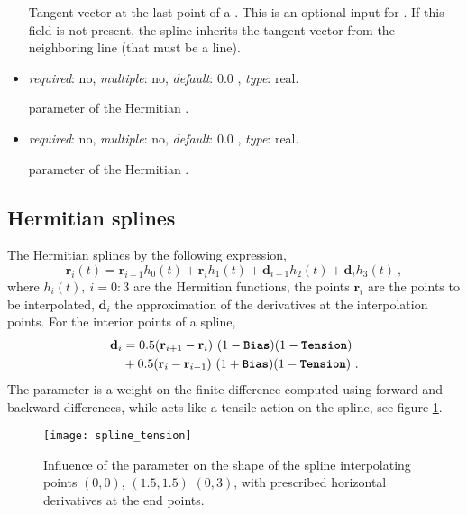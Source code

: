 \begin{itemize}
    Tangent vector at the last point of a . This is an optional input for . If this field is not present, the spline inherits the tangent vector from the neighboring line (that must be a  line).

\item {} \textit{required}: no, \textit{multiple}: no, \textit{default}: 0.0 , \textit{type}: real.

     parameter of the Hermitian .

\item {} \textit{required}: no, \textit{multiple}: no, \textit{default}: 0.0 , \textit{type}: real.

     parameter of the Hermitian .

\end{itemize}

\subsection{Hermitian splines}
The Hermitian splines by the following expression,
\begin{equation}
\mathbf{r}_i(t) = \mathbf{r}_{i-1} h_0(t) + \mathbf{r}_{i} h_1(t) +
                  \mathbf{d}_{i-1} h_2(t) + \mathbf{d}_{i} h_3(t) \ ,
\end{equation}
where $h_i(t), \ i=0:3$ are the Hermitian functions, the points $\mathbf{r}_i$ are the points to be interpolated, $\mathbf{d}_i$ the approximation of the derivatives at the interpolation points. For the interior points of a spline,
\begin{equation}
\begin{aligned}
\mathbf{d}_i & = 0.5 ( \mathbf{r}_{i+1} - \mathbf{r}_{i  } ) \ (1-\param{Bias}) (1-\param{Tension}) \\
             & + 0.5 ( \mathbf{r}_{i  } - \mathbf{r}_{i-1} ) \ (1+\param{Bias}) (1-\param{Tension}) \ .
\end{aligned}
\end{equation}
The  parameter is a weight on the finite difference computed using forward and backward differences, while  acts like a tensile action on the spline, see figure \ref{fig:spline_tension}.
\begin{figure}[h!]
\centering
\texttt{[image: spline\_tension]}
    \caption{Influence of the  parameter on the shape of the spline interpolating points $(0,0)$, $(1.5,1.5)$ $(0,3)$, with prescribed horizontal derivatives at the end points.}
\label{fig:spline_tension}
\end{figure}

